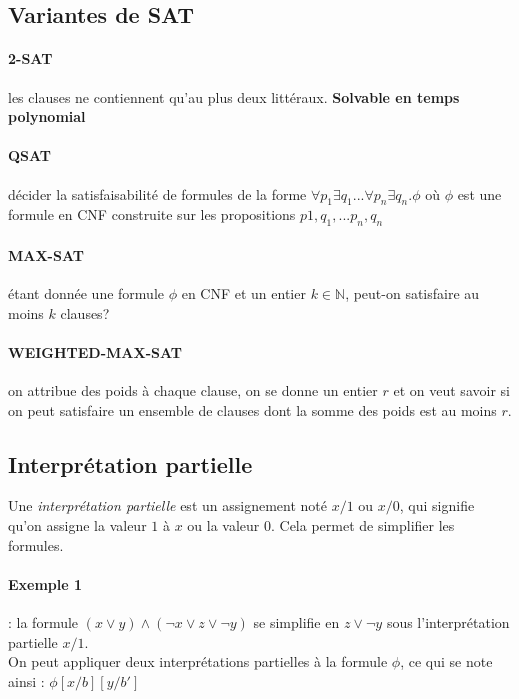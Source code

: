\documentclass[a4paper]{article}
\begin{document}
  \subsection{Variantes de SAT}

    \paragraph{2-SAT} les clauses ne contiennent qu'au plus deux littéraux. \textbf{Solvable en temps polynomial}
    
    \paragraph{QSAT} 
    décider la satisfaisabilité de formules de la forme $\forall p_1 \exists q_1 ... \forall p_n \exists q_n.\phi$
    où $\phi$ est une formule en CNF construite sur les propositions $p1, q_1, ... p_n, q_n$

    \paragraph{MAX-SAT} étant donnée une formule $\phi$ en CNF et un entier $k \in \mathbb{N}$, 
    peut-on satisfaire au moins $k$ clauses?

    \paragraph{WEIGHTED-MAX-SAT} on attribue des poids à chaque clause, on se donne
    un entier $r$ et on veut savoir si on peut satisfaire un ensemble de clauses dont la 
    somme des poids est au moins $r$.

  \subsection{Interprétation partielle}
  Une \textit{interprétation partielle} est un assignement noté $x/1$ ou $x/0$, 
  qui signifie qu'on assigne la valeur $1$ à $x$ ou la valeur $0$. Cela permet
  de simplifier les formules. 

    \paragraph{Exemple 1} : la formule $(x \lor y) \land (\lnot x \lor z \lor \lnot y)$ se simplifie
    en $z \lor \lnot y $ sous l'interprétation partielle $x/1$.\\

  On peut appliquer deux interprétations partielles à la formule $\phi$, ce qui se
  note ainsi : $\phi[x/b][y/b']$
\end{document}
